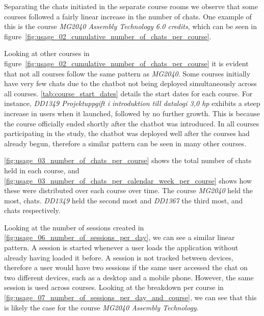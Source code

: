 





Separating the chats initiated in the separate course rooms we observe that some courses followed a fairly linear increase in the number of chats. One example of this is the course \textit{MG2040 Assembly Technology 6.0 credits}, which can be seen in figure~\ref{fig:usage_02_cumulative_number_of_chats_per_course}.





Looking at other courses in figure~\ref{fig:usage_02_cumulative_number_of_chats_per_course} it is evident that not all courses follow the same pattern as \textit{MG2040}. Some courses initially have very few chats due to the chatbot not being deployed simultaneously across all courses. \autoref{tab:course_start_dates} details the start dates for each course. For instance, \textit{DD1349 Projektuppgift i introduktion till datalogi 3,0 hp} exhibits a steep increase in users when it launched, followed by no further growth. This is because the course officially ended shortly after the chatbot was introduced. In all courses participating in the study, the chatbot was deployed well after the courses had already begun, therefore a similar pattern can be seen in many other courses.





\autoref{fig:usage_03_number_of_chats_per_course} shows the total number of chats held in each course, and \autoref{fig:usage_03_number_of_chats_per_calendar_week_per_course} shows how these were distributed over each course over time. The course \textit{MG2040} held the most, chats. \textit{DD1349} held the second most and \textit{DD1367} the third most, and chats respectively.










Looking at the number of sessions created in \autoref{fig:usage_06_number_of_sessions_per_day}, we can see a similar linear pattern. A session is started whenever a user loads the application without already having loaded it before. A session is not tracked between devices, therefore a user would have two sessions if the same user accessed the chat on two different devices, such as a desktop and a mobile phone. However, the same session is used across courses. Looking at the breakdown per course in \autoref{fig:usage_07_number_of_sessions_per_day_and_course}, we can see that this is likely the case for the course \textit{MG2040 Assembly Technology}.


